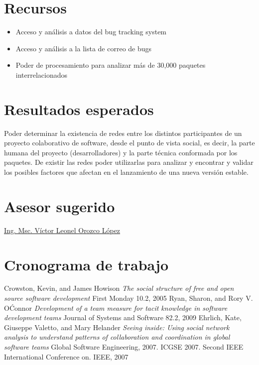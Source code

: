 \documentclass[12pt,titlepage]{report}
\begin{document}
\section{Recursos}
\begin{itemize}
\item Acceso y análisis a datos del bug tracking system
\item Acceso y análisis a la lista de correo de bugs
\item Poder de  procesamiento para  analizar más  de 30,000  paquetes
  interrelacionados
\end{itemize}

\section{Resultados esperados}
Poder determinar  la existencia  de redes  entre los
distintos participantes de un proyecto colaborativo de software, desde
el  punto de  vista social,  es decir,  la parte  humana del  proyecto
(desarrolladores) y la  parte técnica conformada por  los paquetes. De
existir  las  redes poder  utilizarlas  para  analizar y  encontrar  y
validar los  posibles factores  que afectan en  el lanzamiento  de una
nueva versión estable.

\section{Asesor sugerido}

\href{http://vorozco.com/cv/index-es.html}{Ing.  Msc.   Víctor  Leonel
Orozco López}


\section{Cronograma de trabajo} %

\begin{thebibliography}{9}
 Crowston,  Kevin, and James  Howison \textit{The
    social  structure of  free and  open source  software development}
First Monday 10.2, 2005
    Ryan,    Sharon,    and   Rory    V.    O\'Connor
  \textit{Development  of  a  team  measure  for  tacit  knowledge  in
    software development teams}
 Journal  of Systems  and Software 82.2, 2009
Ehrlich, Kate, Giuseppe Valetto, and Mary  Helander
\textit{Seeing inside: Using social
  network  analysis  to  understand   patterns  of  collaboration  and
  coordination   in   global   software  teams}
Global   Software Engineering,   2007.   ICGSE   2007.    Second  IEEE   International
  Conference on.   IEEE, 2007
\end{thebibliography}
\end{document}
